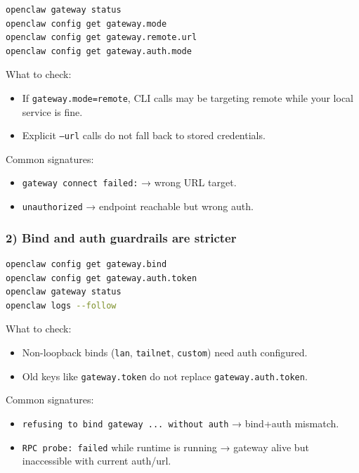 \begin{lstlisting}[language=bash]
openclaw gateway status
openclaw config get gateway.mode
openclaw config get gateway.remote.url
openclaw config get gateway.auth.mode
\end{lstlisting}


What to check:

\begin{itemize}
  \item If \texttt{gateway.mode=remote}, CLI calls may be targeting remote while your local service is fine.
  \item Explicit \texttt{--url} calls do not fall back to stored credentials.
\end{itemize}


Common signatures:

\begin{itemize}
  \item \texttt{gateway connect failed:} → wrong URL target.
  \item \texttt{unauthorized} → endpoint reachable but wrong auth.
\end{itemize}


\subsubsection{2) Bind and auth guardrails are stricter}


\begin{lstlisting}[language=bash]
openclaw config get gateway.bind
openclaw config get gateway.auth.token
openclaw gateway status
openclaw logs --follow
\end{lstlisting}


What to check:

\begin{itemize}
  \item Non-loopback binds (\texttt{lan}, \texttt{tailnet}, \texttt{custom}) need auth configured.
  \item Old keys like \texttt{gateway.token} do not replace \texttt{gateway.auth.token}.
\end{itemize}


Common signatures:

\begin{itemize}
  \item \texttt{refusing to bind gateway ... without auth} → bind+auth mismatch.
  \item \texttt{RPC probe: failed} while runtime is running → gateway alive but inaccessible with current auth/url.
\end{itemize}


